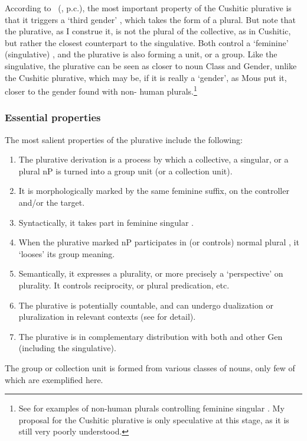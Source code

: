 According to \citeauthor{Mous2012}~(\citeyear{Mous2012}, p.c.), the most
important property of the Cushitic plurative is that it triggers a `third
gender' , which takes the form of a plural. But note that the 
plurative, as I construe it, is not the plural of the collective, as in
Cushitic, but rather the closest counterpart to the singulative. Both control a
`feminine' (singulative) , and the plurative is also forming a unit,
or a group. Like the singulative, the  plurative can be seen as closer to
noun Class and Gender, unlike the Cushitic plurative, which may be, if it is
really a `gender', as Mous put it, closer to the gender found with  non-
human plurals.\footnote{See \citet{FassiFehri2016} for examples of non-human
plurals controlling feminine singular . My proposal for the Cushitic
plurative is only speculative at this stage, as it is still very poorly
understood.}

\subsubsection{Essential properties}

The most salient properties of the plurative include the following:

\begin{enumerate}
  \item The plurative derivation is a process by which a collective, a singular, or a plural nP is turned into a group unit (or a collection unit).
  \item It is morphologically marked by the same feminine suffix, on the controller and/or the target.
  \item Syntactically, it takes part in feminine singular .
  \item When the plurative marked nP participates in (or controls) normal plural , it `looses' its group meaning.
  \item Semantically, it expresses a plurality, or more precisely a `perspective' on plurality. It controls reciprocity, or plural predication, etc.
  \item The plurative is potentially countable, and can undergo dualization or pluralization in relevant contexts (see \citealt{FassiFehri2016} for detail).
  \item The plurative is in complementary distribution with both  and other Gen (including the singulative).
\end{enumerate}
%
The group or collection unit is formed from various classes of nouns, only few
of which are exemplified here.

